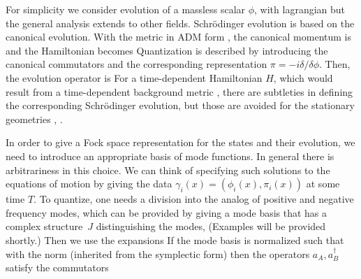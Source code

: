 
For simplicity we consider evolution of a massless scalar $\phi$, with lagrangian
%
\eqn{}
%
but the general analysis extends to other fields.  Schr\"odinger evolution is based on the canonical evolution.  With the metric in ADM form \admmet, the canonical momentum is
%
\eqn{}
%
and the Hamiltonian becomes
%
\eqn{}
%
Quantization is described by introducing the canonical commutators
%
\eqn{}
and the corresponding representation $\pi=-i\delta/\delta\phi$.  Then, the evolution operator is
%
\eqn{}
%
For a time-dependent Hamiltonian $H$, which would result from a time-dependent background metric \admmet, there are subtleties in defining the corresponding Schr\"odinger evolution, but those are avoided for the stationary geometries \admmet, \admvars.

In order to give a Fock space representation for the states and their evolution, we need to introduce an appropriate basis of mode functions.  In general there is arbitrariness in this choice.  We can think of specifying such solutions to the equations of motion by giving the data $\gamma_i(x)= (\phi_i(x), \pi_i(x))$ at some time $T$.  To quantize, one needs a division into the analog of positive and negative frequency modes, which can be provided by giving a mode basis that has a complex structure\ $J$ distinguishing the modes,
%
\eqn{}
%  
(Examples will be provided shortly.)  Then we use the expansions
%
\eqn{}
%
 If the mode basis is normalized such that
%
\eqn{}
%
with the norm (inherited from the symplectic form)
%
\eqn{}
%
then the operators $a_A,a_B^\dagger$ satisfy the commutators
%
\eqn{}
%

